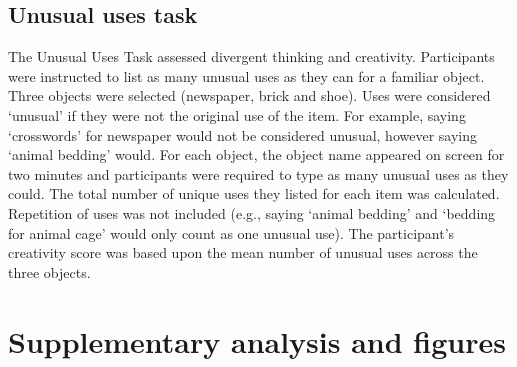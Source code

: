 \subsection{Unusual uses task}
The Unusual Uses Task \cite{Guilford1967} assessed divergent thinking and creativity. Participants were instructed to list as many unusual uses as they can for a familiar object. Three objects were selected (newspaper, brick and shoe). Uses were considered ‘unusual’ if they were not the original use of the item. For example, saying ‘crosswords’ for newspaper would not be considered unusual, however saying ‘animal bedding’ would. For each object, the object name appeared on screen for two minutes and participants were required to type as many unusual uses as they could. The total number of unique uses they listed for each item was calculated. Repetition of uses was not included (e.g., saying ‘animal bedding’ and ‘bedding for animal cage’ would only count as one unusual use).  The participant’s creativity score was based upon the mean number of unusual uses across the three objects.

\newpage
\section{Supplementary analysis and figures}
\label{appendix:study1:subsection3}


